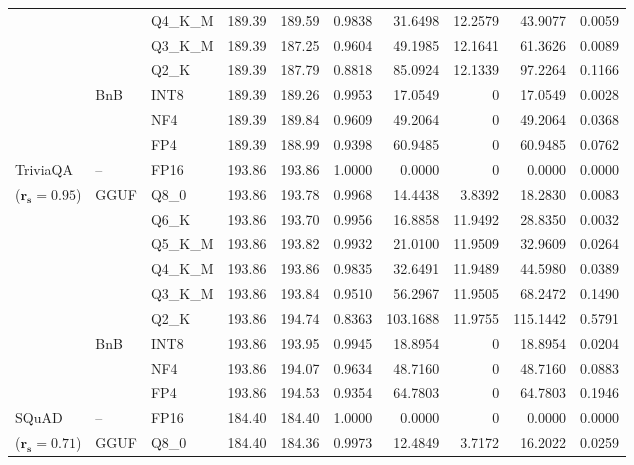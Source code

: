 \begin{longtable}{ll l rrrrrrr}
 &  & Q4\_K\_M & 189.39 & 189.59 & 0.9838 & 31.6498 & 12.2579 & 43.9077 & 0.0059 \\
 &  & Q3\_K\_M & 189.39 & 187.25 & 0.9604 & 49.1985 & 12.1641 & 61.3626 & 0.0089 \\
 &  & Q2\_K & 189.39 & 187.79 & \cellcolor{red!18} 0.8818 & \cellcolor{red!18} 85.0924 & 12.1339 & \cellcolor{red!18} 97.2264 & \cellcolor{red!18} 0.1166 \\
 & BnB & INT8 & 189.39 & 189.26 & 0.9953 & 17.0549 & \cellcolor{cyan!12} $0$ & 17.0549 & 0.0028 \\
 &  & NF4 & 189.39 & 189.84 & 0.9609 & 49.2064 & \cellcolor{cyan!12} $0$ & 49.2064 & 0.0368 \\
 &  & FP4 & 189.39 & 188.99 & \cellcolor{red!18} 0.9398 & \cellcolor{red!18} 60.9485 & \cellcolor{cyan!12} $0$ & \cellcolor{red!18} 60.9485 & \cellcolor{red!18} 0.0762 \\
\midrule
TriviaQA & -- & FP16 & 193.86 & 193.86 & 1.0000 & 0.0000 & \cellcolor{cyan!12} $0$ & 0.0000 & 0.0000 \\
{\small ($\mathbf{r_s{=}0.95}$)} & GGUF & Q8\_0 & 193.86 & 193.78 & 0.9968 & 14.4438 & 3.8392 & 18.2830 & 0.0083 \\
 &  & Q6\_K & 193.86 & 193.70 & 0.9956 & 16.8858 & 11.9492 & 28.8350 & 0.0032 \\
 &  & Q5\_K\_M & 193.86 & 193.82 & 0.9932 & 21.0100 & 11.9509 & 32.9609 & 0.0264 \\
 &  & Q4\_K\_M & 193.86 & 193.86 & 0.9835 & 32.6491 & 11.9489 & 44.5980 & 0.0389 \\
 &  & Q3\_K\_M & 193.86 & 193.84 & 0.9510 & 56.2967 & 11.9505 & 68.2472 & 0.1490 \\
 &  & Q2\_K & 193.86 & 194.74 & \cellcolor{red!18} 0.8363 & \cellcolor{red!18} 103.1688 & 11.9755 & \cellcolor{red!18} 115.1442 & \cellcolor{red!18} 0.5791 \\
 & BnB & INT8 & 193.86 & 193.95 & 0.9945 & 18.8954 & \cellcolor{cyan!12} $0$ & 18.8954 & 0.0204 \\
 &  & NF4 & 193.86 & 194.07 & 0.9634 & 48.7160 & \cellcolor{cyan!12} $0$ & 48.7160 & 0.0883 \\
 &  & FP4 & 193.86 & 194.53 & \cellcolor{red!18} 0.9354 & \cellcolor{red!18} 64.7803 & \cellcolor{cyan!12} $0$ & \cellcolor{red!18} 64.7803 & \cellcolor{red!18} 0.1946 \\
\midrule
SQuAD & -- & FP16 & 184.40 & 184.40 & 1.0000 & 0.0000 & \cellcolor{cyan!12} $0$ & 0.0000 & 0.0000 \\
{\small ($\mathbf{r_s{=}0.71}$)} & GGUF & Q8\_0 & 184.40 & 184.36 & 0.9973 & 12.4849 & 3.7172 & 16.2022 & 0.0259 \\

\end{longtable}
